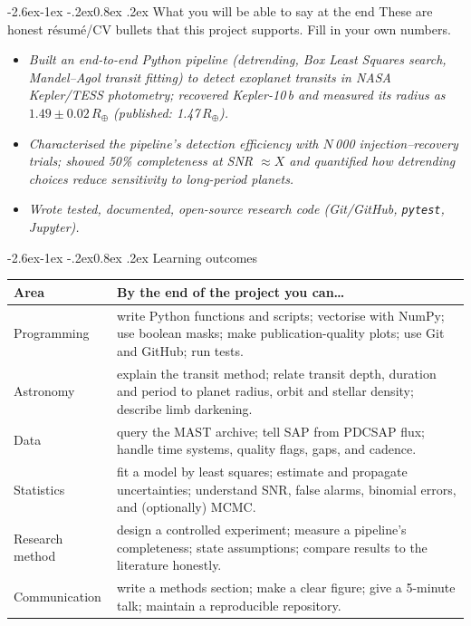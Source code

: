 \documentclass[11pt,a4paper]{article}
\makeatletter
\renewcommand\subsection{\@startsection{subsection}{2}{\z@}%
  {-2.6ex\@plus -1ex \@minus -.2ex}{0.8ex \@plus .2ex}%
  {\normalfont\sffamily\Large\bfseries\color{navy}}}
\newcommand{\Rearth}{\ensuremath{R_\oplus}}
\newcommand{\pkg}[1]{\texttt{#1}}
\makeatother
\begin{document}
\subsection{What you will be able to say at the end}
These are honest résumé/CV bullets that this project supports. Fill in your own numbers.
\begin{itemize}
  \item \emph{Built an end-to-end Python pipeline (detrending, Box Least Squares search, Mandel--Agol transit
        fitting) to detect exoplanet transits in NASA Kepler/TESS photometry; recovered Kepler-10\,b and measured its
        radius as \(1.49\pm0.02\,\Rearth\) (published: 1.47\,\Rearth).}
  \item \emph{Characterised the pipeline's detection efficiency with \(N\)\,000 injection--recovery trials;
        showed 50\% completeness at SNR \(\approx X\) and quantified how detrending choices reduce sensitivity to
        long-period planets.}
  \item \emph{Wrote tested, documented, open-source research code (Git/GitHub, \pkg{pytest}, Jupyter).}
\end{itemize}

\subsection{Learning outcomes}
\begin{center}
\small
\begin{tabularx}{\linewidth}{@{}L{3.3cm} Y@{}}
\toprule
\textbf{Area} & \textbf{By the end of the project you can\ldots}\\
\midrule
Programming & write Python functions and scripts; vectorise with NumPy; use boolean masks; make publication-quality plots; use Git and GitHub; run tests.\\
Astronomy & explain the transit method; relate transit depth, duration and period to planet radius, orbit and stellar density; describe limb darkening.\\
Data & query the MAST archive; tell SAP from PDCSAP flux; handle time systems, quality flags, gaps, and cadence.\\
Statistics & fit a model by least squares; estimate and propagate uncertainties; understand SNR, false alarms, binomial errors, and (optionally) MCMC.\\
Research method & design a controlled experiment; measure a pipeline's completeness; state assumptions; compare results to the literature honestly.\\
Communication & write a methods section; make a clear figure; give a 5-minute talk; maintain a reproducible repository.\\
\bottomrule
\end{tabularx}
\end{center}
\end{document}
